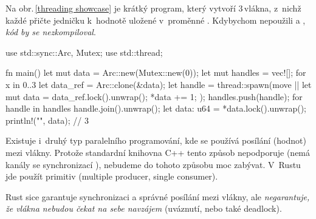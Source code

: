 \documentclass[main.tex]{subfiles}
\begin{document}
Na obr.\,\ref{threading showcase} je krátký program, který vytvoří 3\,vlákna, z~nichž
každé přičte jedničku k~hodnotě uložené v~proměnné . Kdybychom nepoužili
 a , \emph{kód by se nezkompiloval}.

\obrazek
\begin{rustcode}
    use std::sync::{Arc, Mutex};
    use std::thread;

    fn main() {
        let mut data = Arc::new(Mutex::new(0));
        let mut handles = vec![];
        for x in 0..3 {
            let data_ref = Arc::clone(&data);
            let handle = thread::spawn(move || {
                let mut data = data_ref.lock().unwrap();
                *data += 1;
            });
            handles.push(handle);
        }
        for handle in handles {
            handle.join().unwrap();
        }
        let data: u64 = *data.lock().unwrap();
        println!("{}", data); // 3
    }
\end{rustcode}


Existuje i~druhý typ paralelního programování, kde se používá posílání  (hodnot)
mezi vlákny. Protože standardní knihovna C++ tento způsob nepodporuje (nemá kanály se
synchronizací \cite{cppreference}), nebudeme do tohoto způsobu moc zabývat. V~Rustu jde
použít primitiv  (multiple producer, single consumer).
\cite[sekce\,16.2]{thebook}


Rust sice garantuje synchronizaci a správné posílání mezi vlákny, ale \emph{negarantuje,
    že vlákna nebudou čekat na sebe navzájem
} (uváznutí, nebo také deadlock). \cite[sekce\,16.3]{thebook}
\end{document}
